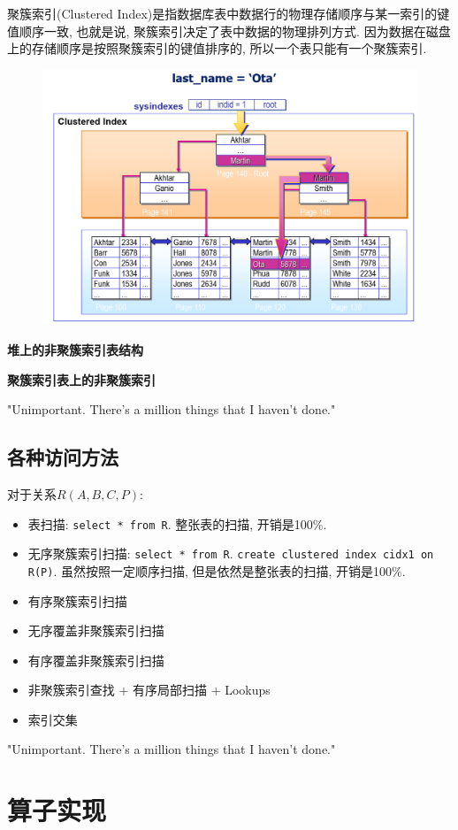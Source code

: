 聚簇索引(Clustered Index)是指数据库表中数据行的物理存储顺序与某一索引的键值顺序一致, 也就是说, 聚簇索引决定了表中数据的物理排列方式. 因为数据在磁盘上的存储顺序是按照聚簇索引的键值排序的, 所以一个表只能有一个聚簇索引.

\begin{figure}[H]
    \centering
    \includegraphics[width=.7\textwidth]{figure/聚簇索引.png}
\end{figure}

\textbf{堆上的非聚簇索引表结构}

\textbf{聚簇索引表上的非聚簇索引}

"Unimportant. There's a million things that I haven't done."

\subsection{各种访问方法}

对于关系$R(A, B, C, P)$:
\begin{itemize}
    \item 表扫描: \verb|select * from R|. 整张表的扫描, 开销是100\%.
    \item 无序聚簇索引扫描: \verb|select * from R|. \verb|create clustered index cidx1 on R(P)|. 虽然按照一定顺序扫描, 但是依然是整张表的扫描, 开销是100\%.
    \item 有序聚簇索引扫描
    \item 无序覆盖非聚簇索引扫描
    \item 有序覆盖非聚簇索引扫描
    \item 非聚簇索引查找 + 有序局部扫描 + Lookups
    \item 索引交集
\end{itemize}

"Unimportant. There's a million things that I haven't done."


\section{算子实现}

